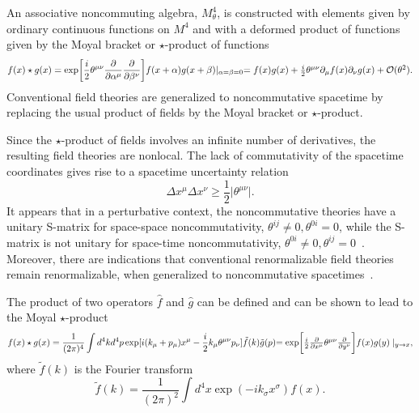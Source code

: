 \documentclass[a4paper,10pt]{article}
\begin{document}
An associative noncommuting algebra, $M^4_{\theta}$, is constructed with
elements given by ordinary continuous functions on $M^4$ and with a
deformed product of functions given by the Moyal bracket or $\star$-product
of functions~\cite{Moyal}
\begin{equation}
f(x)\star g(x)
=\exp\biggl[\frac{i}{2}\theta^{\mu\nu}\frac{\partial}{\partial\alpha^\mu}
\frac{\partial}{\partial\beta^\nu}\biggr]f(x+\alpha)g(x+\beta)\vert_{\alpha=\beta=0}
$$
$$
=f(x)g(x)+\frac{i}{2}\theta^{\mu\nu}\partial_\mu f(x)\partial_\nu
g(x)+{\cal O}(\theta^2).
\end{equation}
Conventional field theories are generalized to noncommutative spacetime
by replacing the usual product of fields by the Moyal bracket or $\star$-product.

Since the $\star$-product of fields involves an infinite number
of derivatives, the resulting field theories are nonlocal. The lack of commutativity of
the spacetime coordinates gives rise to a spacetime uncertainty
relation 
\begin{equation}
\Delta x^\mu\Delta x^\nu \geq \frac{1}{2}\vert\theta^{\mu\nu}\vert.
\end{equation}
It appears that in a perturbative context, the noncommutative theories have
a unitary S-matrix for space-space noncommutativity, 
$\theta^{ij}\not= 0,\theta^{0i}=0$, while the S-matrix is not unitary for
space-time noncommutativity, $\theta^{0i}\not= 
0,\theta^{ij}=0$~\cite{Gomis}. Moreover, there are indications that 
conventional renormalizable field theories remain renormalizable, when 
generalized to noncommutative spacetimes~\cite{Varilly,Martin}.

The product of two operators ${\hat
f}$ and ${\hat g}$ can be defined and can be shown to lead to the Moyal
$\star$-product~\cite{Wess}
\begin{equation}
f(x)\star g(x)=\frac{1}{(2\pi)^4}\int
d^4kd^4p\exp[i(k_\mu+p_\mu)x^\mu-\frac{i}{2}k_\mu\theta^{\mu\nu}p_\nu]{\tilde
f}(k){\tilde g}(p)
$$
$$
=\exp\biggl[\frac{i}{2}\frac{\partial}{\partial
x^\mu}\theta^{\mu\nu}\frac{\partial}{\partial
y^\nu}\biggr]f(x)g(y)\mid_{y\rightarrow x},
\end{equation}
where ${\tilde f}(k)$ is the Fourier transform
\begin{equation}
{\tilde f}(k)=\frac{1}{(2\pi)^2}\int d^4x\exp(-ik_\sigma x^\sigma)f(x).
\end{equation}
\end{document}
